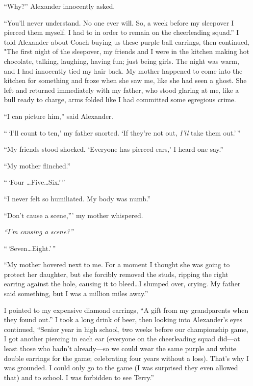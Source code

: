 ``Why?'' Alexander innocently asked.

``You'll never understand. No one ever will. So, a week before my
sleepover I pierced them myself. I had to in order to remain on the
cheerleading squad.'' I told Alexander about Coach buying us these
purple ball earrings, then continued, "The first night of the sleepover,
my friends and I were in the kitchen making hot chocolate, talking,
laughing, having fun; just being girls. The night was warm, and I had
innocently tied my hair back. My mother happened to come into the
kitchen for something and froze when she saw me, like she had seen a
ghost. She left and returned immediately with my father, who stood
glaring at me, like a bull ready to charge, arms folded like I had
committed some egregious crime.

``I can picture him,'' said Alexander.

``\,`I'll count to ten,' my father snorted. `If they're not out,
\emph{I'll} take them out.'\,''

``My friends stood shocked. `Everyone has pierced ears,' I heard one
say.''

``My mother flinched.''

``\,`Four \ldots Five\ldots Six.'\,''

``I never felt so humiliated. My body was numb.''

``Don't cause a scene,''' my mother whispered.

\emph{``I'm causing a scene?''}

``\,`Seven\ldots Eight.'\,''

``My mother hovered next to me. For a moment I thought she was going to
protect her daughter, but she forcibly removed the studs, ripping the
right earring against the hole, causing it to bleed\ldots I slumped
over, crying. My father said something, but I was a million miles
away.''

I pointed to my expensive diamond earrings, ``A gift from my
grandparents when they found out.'' I took a long drink of beer, then
looking into Alexander's eyes continued, ``Senior year in high school,
two weeks before our championship game, I got another piercing in each
ear (everyone on the cheerleading squad did---at least those who hadn't
already---so we could wear the same purple and white double earrings for
the game; celebrating four years without a loss). That's why I was
grounded. I could only go to the game (I was surprised they even allowed
that) and to school. I was forbidden to see Terry.''

